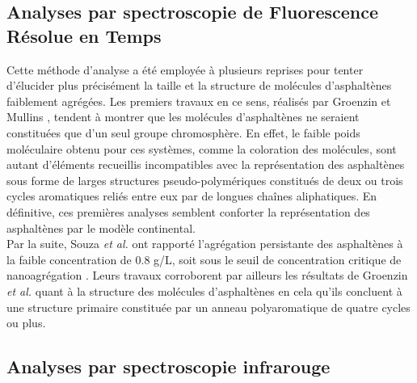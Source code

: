 	
	
	\subsection{Analyses par spectroscopie de Fluorescence Résolue en Temps} 
	
	Cette méthode d'analyse a été employée à plusieurs reprises pour tenter d'élucider plus précisément la taille et la structure de molécules d'asphaltènes faiblement agrégées.  
	Les premiers travaux en ce sens, réalisés par Groenzin et Mullins  \cite{groenzin1999asphaltene}, tendent à montrer que les molécules d'asphaltènes ne seraient constituées que d'un seul groupe chromosphère. En effet, le faible poids moléculaire obtenu pour ces systèmes, comme la coloration des molécules, sont autant d'éléments recueillis incompatibles avec la représentation des asphaltènes sous forme de larges structures pseudo-polymériques constitués de deux ou trois cycles aromatiques reliés entre eux par de longues chaînes aliphatiques. En définitive, ces premières analyses semblent conforter la représentation des asphaltènes par le modèle continental. \\
	Par la suite, Souza \textit{et al.} ont rapporté l'agrégation persistante des asphaltènes à la faible concentration de 0.8 g/L, soit sous le seuil de concentration critique de nanoagrégation \cite{souza2009study}. Leurs travaux corroborent par ailleurs les résultats de Groenzin \textit{et al.} quant à la structure des molécules d'asphaltènes en cela qu'ils concluent à une structure primaire constituée par un anneau polyaromatique de quatre cycles ou plus. 
	
	
	\bigskip
	
	\subsection{Analyses par spectroscopie infrarouge}
	
